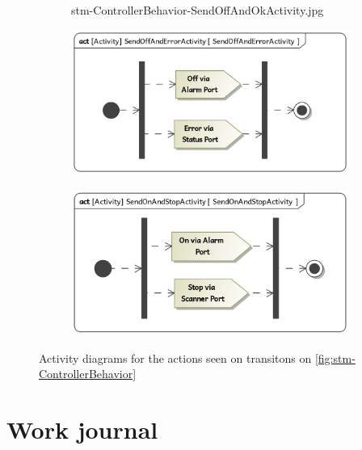 \documentclass[a4paper]{article}
\begin{document}
\begin{figure}[hb]
\begin{subfigure}{.33\textwidth}
		{stm-ControllerBehavior-SendOffAndOkActivity.jpg}
	\end{subfigure}
	\begin{subfigure}{.33\textwidth}
		\includegraphics[width=\textwidth]
		{stm-ControllerBehavior-SendOffAndErrorActivity.jpg}
	\end{subfigure}
	\begin{subfigure}{.33\textwidth}
		\includegraphics[width=\textwidth]
		{stm-ControllerBehavior-SendOnAndStopActivity.jpg}
	\end{subfigure}
	\caption{Activity diagrams for the actions seen on transitons on
		\cref{fig:stm-ControllerBehavior}}%
	\label{fig:stm-ControllerBehavior-actions}
\end{figure}

\section{Work journal}
\end{document}
